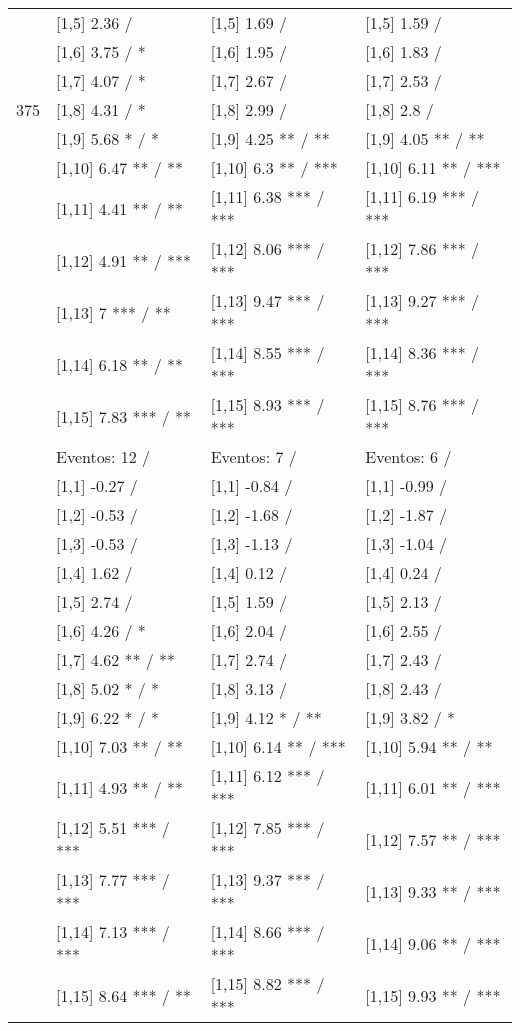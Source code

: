 \begin{table}
\begin{tabular}[t]{llll}
 & {}[1,5] 2.36  / & {}[1,5] 1.69  / & {}[1,5] 1.59  /\\
 & {}[1,6] 3.75  / * & {}[1,6] 1.95  / & {}[1,6] 1.83  /\\
 & {}[1,7] 4.07  / * & {}[1,7] 2.67  / & {}[1,7] 2.53  /\\
375 & {}[1,8] 4.31  / * & {}[1,8] 2.99  / & {}[1,8] 2.8  /\\
\addlinespace
 & {}[1,9] 5.68 * / * & {}[1,9] 4.25 ** / ** & {}[1,9] 4.05 ** / **\\
 & {}[1,10] 6.47 ** / ** & {}[1,10] 6.3 ** / *** & {}[1,10] 6.11 ** / ***\\
 & {}[1,11] 4.41 ** / ** & {}[1,11] 6.38 *** / *** & {}[1,11] 6.19 *** / ***\\
 & {}[1,12] 4.91 ** / *** & {}[1,12] 8.06 *** / *** & {}[1,12] 7.86 *** / ***\\
 & {}[1,13] 7 *** / ** & {}[1,13] 9.47 *** / *** & {}[1,13] 9.27 *** / ***\\
\addlinespace
 & {}[1,14] 6.18 ** / ** & {}[1,14] 8.55 *** / *** & {}[1,14] 8.36 *** / ***\\
 & {}[1,15] 7.83 *** / ** & {}[1,15] 8.93 *** / *** & {}[1,15] 8.76 *** / ***\\
 & Eventos:  12 / & Eventos:  7 / & Eventos:  6 /\\
 & {}[1,1] -0.27  / & {}[1,1] -0.84  / & {}[1,1] -0.99  /\\
 & {}[1,2] -0.53  / & {}[1,2] -1.68  / & {}[1,2] -1.87  /\\
\addlinespace
 & {}[1,3] -0.53  / & {}[1,3] -1.13  / & {}[1,3] -1.04  /\\
 & {}[1,4] 1.62  / & {}[1,4] 0.12  / & {}[1,4] 0.24  /\\
 & {}[1,5] 2.74  / & {}[1,5] 1.59  / & {}[1,5] 2.13  /\\
 & {}[1,6] 4.26  / * & {}[1,6] 2.04  / & {}[1,6] 2.55  /\\
 & {}[1,7] 4.62 ** / ** & {}[1,7] 2.74  / & {}[1,7] 2.43  /\\
\addlinespace
500 & {}[1,8] 5.02 * / * & {}[1,8] 3.13  / & {}[1,8] 2.43  /\\
 & {}[1,9] 6.22 * / * & {}[1,9] 4.12 * / ** & {}[1,9] 3.82  / *\\
 & {}[1,10] 7.03 ** / ** & {}[1,10] 6.14 ** / *** & {}[1,10] 5.94 ** / **\\
 & {}[1,11] 4.93 ** / ** & {}[1,11] 6.12 *** / *** & {}[1,11] 6.01 ** / ***\\
 & {}[1,12] 5.51 *** / *** & {}[1,12] 7.85 *** / *** & {}[1,12] 7.57 ** / ***\\
\addlinespace
 & {}[1,13] 7.77 *** / *** & {}[1,13] 9.37 *** / *** & {}[1,13] 9.33 ** / ***\\
 & {}[1,14] 7.13 *** / *** & {}[1,14] 8.66 *** / *** & {}[1,14] 9.06 ** / ***\\
 & {}[1,15] 8.64 *** / ** & {}[1,15] 8.82 *** / *** & {}[1,15] 9.93 ** / ***\\
\bottomrule
\end{tabular}
\end{table}
